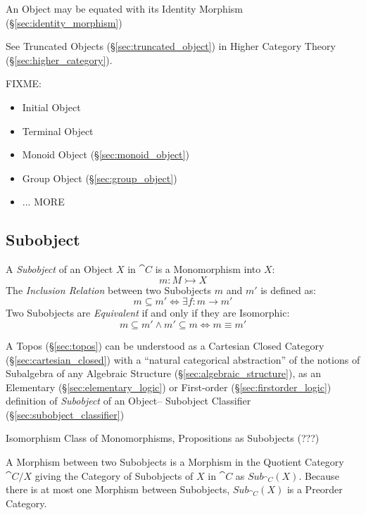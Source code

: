 An Object may be equated with its Identity Morphism
(\S\ref{sec:identity_morphism})

\fist See Truncated Objects (\S\ref{sec:truncated_object}) in Higher
Category Theory (\S\ref{sec:higher_category}).

FIXME:

\begin{itemize}
  \item Initial Object
  \item Terminal Object
  \item Monoid Object (\S\ref{sec:monoid_object})
  \item Group Object (\S\ref{sec:group_object})
  \item ... MORE
\end{itemize}



\subsection{Subobject}\label{sec:subobject}

A \emph{Subobject} of an Object $X$ in $\cat{C}$ is a Monomorphism
into $X$:
\[
  m : M \rightarrowtail X
\]
The \emph{Inclusion Relation} between two Subobjects $m$ and $m'$ is
defined as:
\[
  m \subseteq m' \Leftrightarrow \exists f : m \rightarrow m'
\]
Two Subobjects are \emph{Equivalent} if and only if they are
Isomorphic:
\[
  m \subseteq m' \wedge m' \subseteq m \Leftrightarrow m \equiv m'
\]

\fist A Topos (\S\ref{sec:topos}) can be understood as a Cartesian Closed
Category (\S\ref{sec:cartesian_closed}) with a ``natural categorical
abstraction'' of the notions of Subalgebra of any Algebraic Structure
(\S\ref{sec:algebraic_structure}), as an Elementary
(\S\ref{sec:elementary_logic}) or First-order (\S\ref{sec:firstorder_logic})
definition of \emph{Subobject} of an Object-- Subobject Classifier
(\S\ref{sec:subobject_classifier})

Isomorphism Class of Monomorphisms, Propositions as Subobjects (???)

A Morphism between two Subobjects is a Morphism in the Quotient
Category $\cat{C}/X$ giving the Category of Subobjects of $X$ in
$\cat{C}$ as $Sub_{\cat{C}}(X)$. Because there is at most one
Morphism between Subobjects, $Sub_{\cat{C}}(X)$ is a Preorder
Category.


